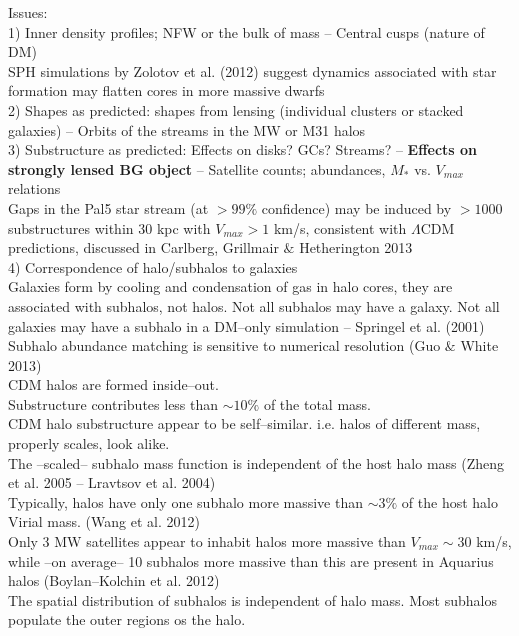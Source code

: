 \documentclass[paper=a4, fontsize=11pt]{scrartcl} %
\numberwithin{equation}{section} %
\numberwithin{figure}{section} %
\numberwithin{table}{section} %
\begin{document}
Issues:\\
1) Inner density profiles; NFW or the bulk of mass -- Central cusps (nature of DM)\\
SPH simulations by Zolotov et al. (2012) suggest dynamics associated with star formation may flatten cores in more massive dwarfs\\
2) Shapes as predicted: shapes from lensing (individual clusters or stacked galaxies) -- Orbits of the streams in the MW or M31 halos\\
3) Substructure as predicted: Effects on disks? GCs? Streams? -- {\bf Effects on strongly lensed BG object} -- Satellite counts; abundances, $M_*$ vs. $V_{max}$ relations\\
Gaps in the Pal5 star stream (at $> 99\%$ confidence) may be induced by $> 1000$ substructures within 30 kpc with $V_{max} > 1$ km/s, consistent with $\Lambda$CDM predictions, discussed in Carlberg, Grillmair $\&$ Hetherington 2013\\
4) Correspondence of halo/subhalos to galaxies\\
Galaxies form by cooling and condensation of gas in halo cores, they are associated with subhalos, not halos. Not all subhalos may have a galaxy. Not all galaxies may have a subhalo in a DM--only simulation -- Springel et al. (2001)\\
Subhalo abundance matching is sensitive to numerical resolution (Guo $\&$ White 2013)\\
CDM halos are formed inside--out.\\
Substructure contributes less than $\sim 10\%$ of the total mass.\\
CDM halo substructure appear to be self--similar. i.e. halos of different mass, properly scales, look alike.\\
The --scaled-- subhalo mass function is independent of the host halo mass (Zheng et al. 2005 -- Lravtsov et al. 2004)\\
Typically, halos have only one subhalo more massive than $\sim 3\%$ of the host halo Virial mass. (Wang et al. 2012)\\
Only 3 MW satellites appear to inhabit halos more massive than $V_{max} \sim 30$ km/s, while --on average-- 10 subhalos more massive than this are present in Aquarius halos (Boylan--Kolchin et al. 2012)\\
The spatial distribution of subhalos is independent of halo mass. Most subhalos populate the outer regions os the halo.\\
\end{document}
